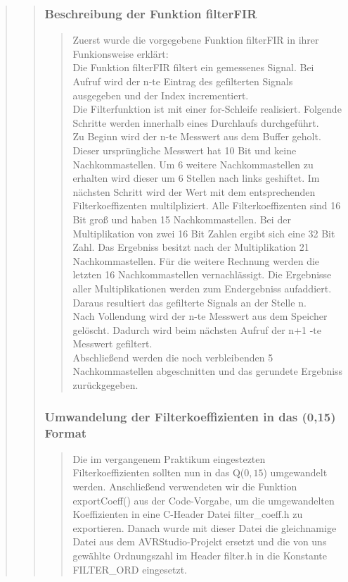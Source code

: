 \begin{quote}
\begin{quote}
    	\subsubsection{Beschreibung der Funktion filterFIR}
    	\begin{quote}
    	Zuerst wurde die vorgegebene Funktion filterFIR in ihrer Funkionsweise
    	erklärt:\\ 
    	Die Funktion filterFIR filtert ein gemessenes Signal. Bei Aufruf
    	wird der n-te Eintrag des gefilterten Signals ausgegeben und der Index incrementiert.\\
    	Die Filterfunktion ist mit einer for-Schleife realisiert. Folgende Schritte werden innerhalb eines Durchlaufs
    	durchgeführt.\\
    	Zu Beginn wird der n-te Messwert aus dem Buffer geholt. Dieser ursprüngliche Messwert hat 10 Bit und keine
    	Nachkommastellen. Um 6 weitere Nachkommastellen zu erhalten wird dieser um 6 Stellen nach links geshiftet. Im
        nächsten Schritt wird der Wert mit dem entsprechenden Filterkoeffizenten multilpliziert. Alle Filterkoeffizenten
        sind 16 Bit groß und haben 15 Nachkommastellen. Bei der Multiplikation
        von zwei 16 Bit Zahlen ergibt sich eine 32 Bit Zahl. Das Ergebniss
        besitzt nach der Multiplikation 21 Nachkommastellen. Für die weitere Rechnung werden die letzten 16 Nachkommastellen vernachlässigt. 
        Die Ergebnisse aller Multiplikationen werden zum Endergebniss
        aufaddiert. Daraus resultiert das gefilterte Signals an der Stelle n.\\
        Nach Vollendung wird der n-te Messwert aus dem Speicher gelöscht.
        Dadurch wird beim nächsten Aufruf der n+1 -te Messwert gefiltert.\\
        Abschließend werden die noch verbleibenden 5 Nachkommastellen abgeschnitten und das gerundete Ergebniss
        zurückgegeben.
        
		\end{quote}
		
		\subsubsection{Umwandelung der Filterkoeffizienten in das (0,15) Format}
		\begin{quote}
		
		Die im vergangenem Praktikum eingestezten Filterkoeffizienten sollten nun in
		das Q($0,15$) umgewandelt werden. 
		Anschließend verwendeten wir die Funktion exportCoeff() aus der Code-Vorgabe,
		um die umgewandelten Koeffizienten in eine C-Header Datei filter\_coeff.h zu
		exportieren. Danach wurde mit dieser Datei die gleichnamige Datei aus dem
		AVRStudio-Projekt ersetzt und die von uns gewählte Ordnungszahl im Header
		filter.h in die Konstante FILTER\_ORD eingesetzt. 
		

\end{quote}
\end{quote}
\end{quote}
